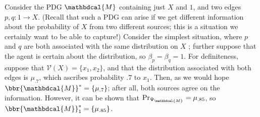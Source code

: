 \documentclass[letterpaper]{article} %
\theoremstyle{plain}
\theoremstyle{definition}
\theoremstyle{remark}
\newcommand{\V}{\mathcal V}
\newcommand{\dg}[1]{\mathbdcal{#1}}
\newcommand{\WFGof}[1]{\Psi_{{#1}}}
\begin{document}
\begin{example}\label{ex:overdet}
Consider the PDG $\dg M$ containing just $X$ and $1$, and two edges
$p, q: 1 \to X$.
(Recall that such a PDG can arise if we get different information about the
probability of $X$ from two different 
sources; this is a situation we
certainly want to be able to capture!)
Consider the simplest situation, where $p$ and $q$ are both associated
with the same distribution on $X$%
; further suppose that the agent is certain about the distribution, so
$\beta_p = \beta_q = 1$.
For definiteness, suppose that
$\V(X) = \{x_1,x_2\}$, and
that the distribution associated with both edges is $\mu_{.7}$, which ascribes
probability $.7$ to $x_1$. Then, as we would hope  $\bbr{\dg M}^* =
\{\mu_{.7}\}$; after all, both sources agree on the information.
However, it can be shown that 
$\Pr_{\WFGof{\dg M}} = \mu_{.85}$, so  $\bbr{\dg M}_1^* = \{\mu_{.85}\}$.
\end{example}
\end{document}

